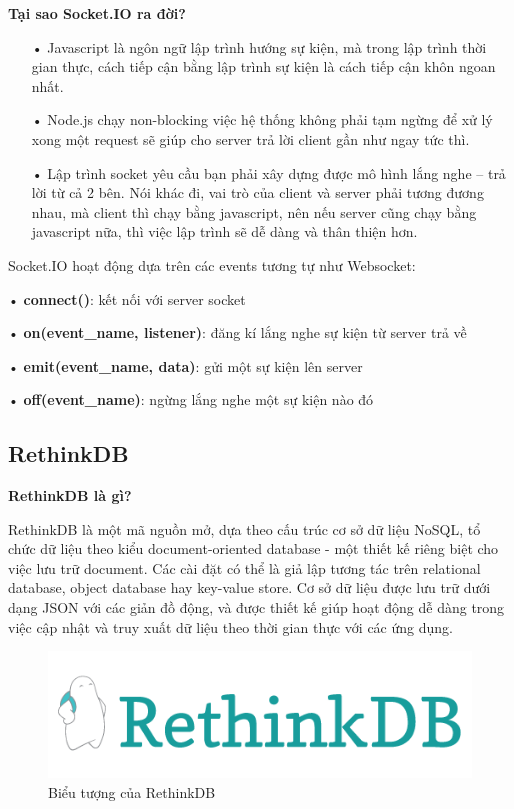 \textbf{Tại sao Socket.IO ra đời?}

\begin{itemize}
\item[•]Javascript là ngôn ngữ lập trình hướng sự kiện, mà trong lập trình thời gian thực, cách tiếp cận bằng lập trình sự kiện là cách tiếp cận khôn ngoan nhất.
\item[•]Node.js chạy non-blocking việc hệ thống không phải tạm ngừng để xử lý xong một request sẽ giúp cho server trả lời client gần như ngay tức thì.
\item[•]Lập trình socket yêu cầu bạn phải xây dựng được mô hình lắng nghe – trả lời từ cả 2 bên. Nói khác đi, vai trò của client và server phải tương đương nhau, mà client thì chạy bằng javascript, nên nếu server cũng chạy bằng javascript nữa, thì việc lập trình sẽ dễ dàng và thân thiện hơn.
\end{itemize}

Socket.IO hoạt động dựa trên các events tương tự như Websocket:

• \textbf{connect()}: kết nối với server socket

• \textbf{on(event\_name, listener)}: đăng kí lắng nghe sự kiện từ server trả về

• \textbf{emit(event\_name, data)}: gửi một sự kiện lên server

• \textbf{off(event\_name)}: ngừng lắng nghe một sự kiện nào đó

\subsection{RethinkDB}

\textbf{RethinkDB là gì?}

RethinkDB là một mã nguồn mở, dựa theo cấu trúc cơ sở dữ liệu NoSQL, tổ chức dữ liệu theo kiểu document-oriented database - một thiết kế riêng biệt cho việc lưu trữ document. Các cài đặt có thể là giả lập tương tác trên relational database, object database hay key-value store. Cơ sở dữ liệu được lưu trữ dưới dạng JSON  với các giản đồ động, và được thiết kế giúp hoạt động dễ dàng trong việc cập nhật và truy xuất dữ liệu theo thời gian thực với các ứng dụng. 

\begin{figure}[H]
	\centering    
	\includegraphics[width=1\textwidth]{rethinkdb}
	\caption[Biểu tượng của RethinkDB]{Biểu tượng của RethinkDB}
	\label{fig: rethinkdb}
\end{figure}

